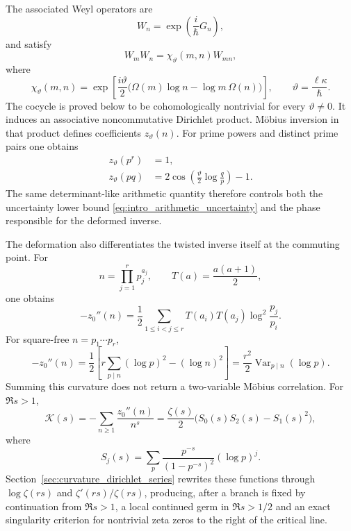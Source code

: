 \documentclass[11pt]{amsart}
\numberwithin{equation}{section}
\theoremstyle{plain}
\theoremstyle{definition}
\theoremstyle{remark}
\begin{document}
The associated Weyl operators are
\begin{equation}
W_n=\exp\left(\frac{i}{\hbar}G_n\right),
\label{eq:intro_Wn}
\end{equation}
and satisfy
\begin{equation}
W_mW_n
=
\chi_\vartheta(m,n)W_{mn},
\label{eq:intro_twisted_product}
\end{equation}
where
\begin{equation}
\chi_\vartheta(m,n)
=
\exp\left[
\frac{i\vartheta}{2}
\bigl(\Omega(m)\log n-\log m\,\Omega(n)\bigr)
\right],
\qquad
\vartheta=\frac{\ell\kappa}{\hbar}.
\label{eq:intro_cocycle}
\end{equation}
The cocycle is proved below to be cohomologically nontrivial for every
\(\vartheta\ne0\).  It induces an associative noncommutative Dirichlet
product.  M\"obius inversion in that product defines coefficients
\(z_\vartheta(n)\).  For prime powers and distinct prime pairs one obtains
\begin{align}
z_\vartheta(p^r)&=1,
\label{eq:intro_prime_power_formula}\\
z_\vartheta(pq)
&=2\cos\left(\frac{\vartheta}{2}\log\frac{q}{p}\right)-1.
\label{eq:intro_prime_pair_formula}
\end{align}
The same determinant-like arithmetic quantity therefore controls both the
uncertainty lower bound \eqref{eq:intro_arithmetic_uncertainty} and the phase
responsible for the deformed inverse.


The deformation also differentiates the twisted inverse itself at the commuting
point. For
\begin{equation}
n=\prod_{j=1}^{r}p_j^{a_j},
\qquad
T(a)=\frac{a(a+1)}2,
\label{eq:intro_factorization_T}
\end{equation}
one obtains
\begin{equation}
\boxed{
-z_0''(n)=\frac12\sum_{1\le i<j\le r}
T(a_i)T(a_j)\log^2\!\frac{p_j}{p_i}.}
\label{eq:intro_curvature_formula}
\end{equation}
For square-free \(n=p_1\cdots p_r\),
\begin{equation}
\boxed{
-z_0''(n)=\frac12\left[r\sum_{p\mid n}(\log p)^2-(\log n)^2\right]
=\frac{r^2}{2}\operatorname{Var}_{p\mid n}(\log p).}
\label{eq:intro_variance_formula}
\end{equation}
Summing this curvature does not return a two-variable M\"obius correlation.
For \(\Re s>1\),
\begin{equation}
\mathcal K(s)=-\sum_{n\ge1}\frac{z_0''(n)}{n^s}
=\frac{\zeta(s)}2\bigl(S_0(s)S_2(s)-S_1(s)^2\bigr),
\label{eq:intro_curvature_determinant}
\end{equation}
where
\begin{equation}
S_j(s)=\sum_p\frac{p^{-s}}{(1-p^{-s})^2}(\log p)^j.
\label{eq:intro_Sj}
\end{equation}
Section~\ref{sec:curvature_dirichlet_series} rewrites these functions through
\(\log\zeta(rs)\) and \(\zeta'(rs)/\zeta(rs)\), producing, after a branch is fixed by continuation from \(\Re s>1\), a local
continued germ in \(\Re s>1/2\) and an exact singularity criterion for
nontrivial zeta zeros to the right of the critical line.
\end{document}
